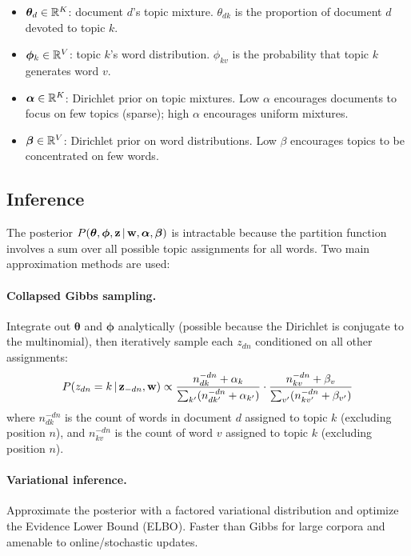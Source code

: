 \begin{itemize}
    \item $\bm{\theta}_d \in \mathbb{R}^K$: document $d$'s topic mixture.
          $\theta_{dk}$ is the proportion of document $d$ devoted to topic $k$.
    \item $\bm{\phi}_k \in \mathbb{R}^V$: topic $k$'s word distribution.
          $\phi_{kv}$ is the probability that topic $k$ generates word $v$.
    \item $\bm{\alpha} \in \mathbb{R}^K$: Dirichlet prior on topic mixtures.
          Low $\alpha$ encourages documents to focus on few topics (sparse);
          high $\alpha$ encourages uniform mixtures.
    \item $\bm{\beta} \in \mathbb{R}^V$: Dirichlet prior on word distributions.
          Low $\beta$ encourages topics to be concentrated on few words.
\end{itemize}

\subsection{Inference}

The posterior $P(\bm{\theta}, \bm{\phi}, \mathbf{z} \,|\, \mathbf{w}, \bm{\alpha}, \bm{\beta})$
is intractable because the partition function involves a sum over all possible
topic assignments for all words.  Two main approximation methods are used:

\paragraph{Collapsed Gibbs sampling.}
Integrate out $\bm{\theta}$ and $\bm{\phi}$ analytically (possible because the
Dirichlet is conjugate to the multinomial), then iteratively sample each
$z_{dn}$ conditioned on all other assignments:
\begin{equation}
P(z_{dn} = k \,|\, \mathbf{z}_{-dn}, \mathbf{w})
\propto \frac{n_{dk}^{-dn} + \alpha_k}{\sum_{k'} (n_{dk'}^{-dn} + \alpha_{k'})}
\cdot \frac{n_{kv}^{-dn} + \beta_v}{\sum_{v'} (n_{kv'}^{-dn} + \beta_{v'})}
\label{eq:gibbs_lda}
\end{equation}
where $n_{dk}^{-dn}$ is the count of words in document $d$ assigned to topic
$k$ (excluding position $n$), and $n_{kv}^{-dn}$ is the count of word $v$
assigned to topic $k$ (excluding position $n$).

\paragraph{Variational inference.}
Approximate the posterior with a factored variational distribution and
optimize the Evidence Lower Bound (ELBO).  Faster than Gibbs for large
corpora and amenable to online/stochastic updates.

